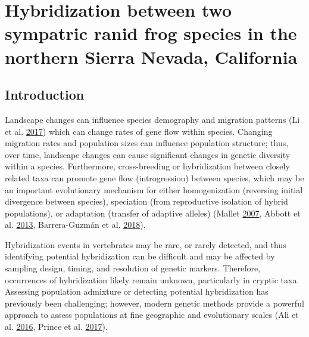 \documentclass[proquest,12pt,final]{ucthesis-CA2012} %
\begin{document}
\begin{ucmainmatter}
\hypertarget{hybrids}{%
\chapter{Hybridization between two sympatric ranid frog species in the
northern Sierra Nevada, California}\label{hybrids}}

\hypertarget{introduction-1}{%
\section{Introduction}\label{introduction-1}}

Landscape changes can influence species demography and migration
patterns (Li et al. \protect\hyperlink{ref-li_ten_2017}{2017}) which can
change rates of gene flow within species. Changing migration rates and
population sizes can influence population structure; thus, over time,
landscape changes can cause significant changes in genetic diversity
within a species. Furthermore, cross-breeding or hybridization between
closely related taxa can promote gene flow (introgression) between
species, which may be an important evolutionary mechanism for either
homogenization (reversing initial divergence between species),
speciation (from reproductive isolation of hybrid populations), or
adaptation (transfer of adaptive alleles) (Mallet
\protect\hyperlink{ref-mallet_hybrid_2007}{2007}, Abbott et al.
\protect\hyperlink{ref-abbott_hybridization_2013}{2013}, Barrera-Guzmán
et al. \protect\hyperlink{ref-barrera-guzman_hybrid_2018}{2018}).

Hybridization events in vertebrates may be rare, or rarely detected, and
thus identifying potential hybridization can be difficult and may be
affected by sampling design, timing, and resolution of genetic markers.
Therefore, occurrences of hybridization likely remain unknown,
particularly in cryptic taxa. Assessing population admixture or
detecting potential hybridization has previously been challenging;
however, modern genetic methods provide a powerful approach to assess
populations at fine geographic and evolutionary scales (Ali et al.
\protect\hyperlink{ref-ali_rad_2016}{2016}, Prince et al.
\protect\hyperlink{ref-prince_evolutionary_2017}{2017}).


\end{ucmainmatter}
\end{document}
